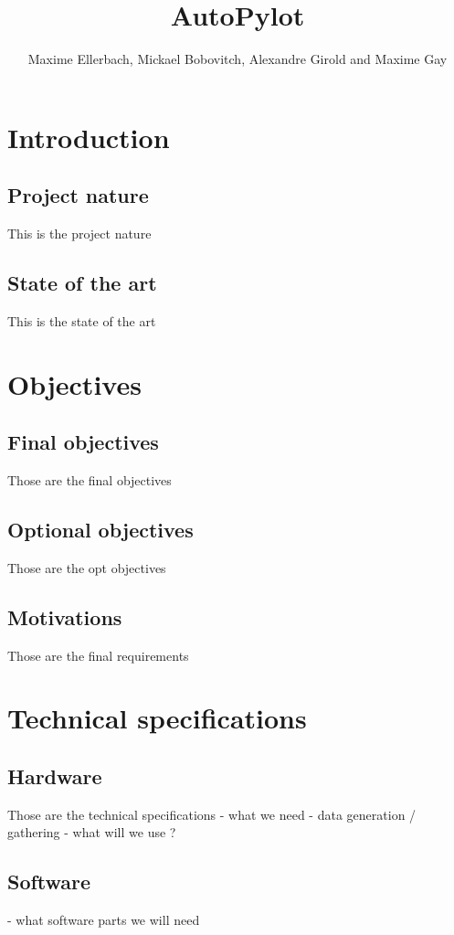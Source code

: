 \documentclass{article}
\title{\huge AutoPylot}
\author{Maxime Ellerbach, Mickael Bobovitch, Alexandre Girold and Maxime Gay}
\begin{document}
\maketitle
\newpage

\tableofcontents
\newpage

\section{Introduction}

\subsection{Project nature}
This is the project nature

\subsection{State of the art}
This is the state of the art

\section{Objectives}

\subsection{Final objectives}
Those are the final objectives

\subsection{Optional objectives}
Those are the opt objectives

\subsection{Motivations}
Those are the final requirements

\section{Technical specifications}

\subsection{Hardware}
Those are the technical specifications
- what we need
- data generation / gathering
- what will we use ?

\subsection{Software}
- what software parts we will need
\end{document}
